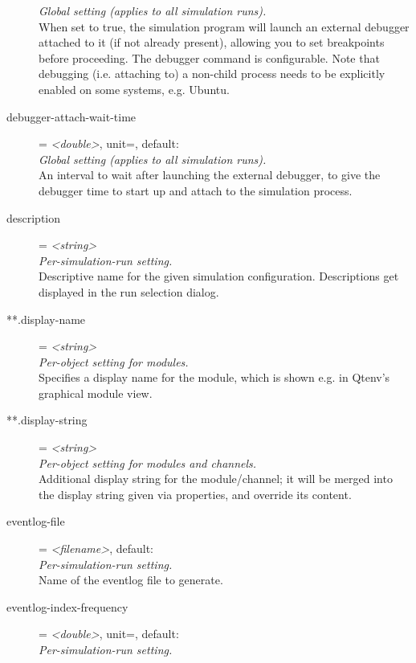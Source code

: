 \begin{description}
    \textit{Global setting (applies to all simulation runs).}\\
    When set to true, the simulation program will launch an external debugger
    attached to it (if not already present), allowing you to set breakpoints
    before proceeding. The debugger command is configurable. Note that
    debugging (i.e. attaching to) a non-child process needs to be explicitly
    enabled on some systems, e.g. Ubuntu.
\item[debugger-attach-wait-time] = \textit{<double>}, unit=, default: \\
    \textit{Global setting (applies to all simulation runs).}\\
    An interval to wait after launching the external debugger, to give the
    debugger time to start up and attach to the simulation process.
\item[description] = \textit{<string>}\\
    \textit{Per-simulation-run setting.}\\
    Descriptive name for the given simulation configuration. Descriptions get
    displayed in the run selection dialog.
\item[**.display-name] = \textit{<string>}\\
    \textit{Per-object setting for modules.}\\
    Specifies a display name for the module, which is shown e.g. in Qtenv's
    graphical module view.
\item[**.display-string] = \textit{<string>}\\
    \textit{Per-object setting for modules and channels.}\\
    Additional display string for the module/channel; it will be merged into
    the display string given via  properties, and
    override its content.
\item[eventlog-file] = \textit{<filename>}, default: \\
    \textit{Per-simulation-run setting.}\\
    Name of the eventlog file to generate.
\item[eventlog-index-frequency] = \textit{<double>}, unit=, default: \\
    \textit{Per-simulation-run setting.}\\

\end{description}
